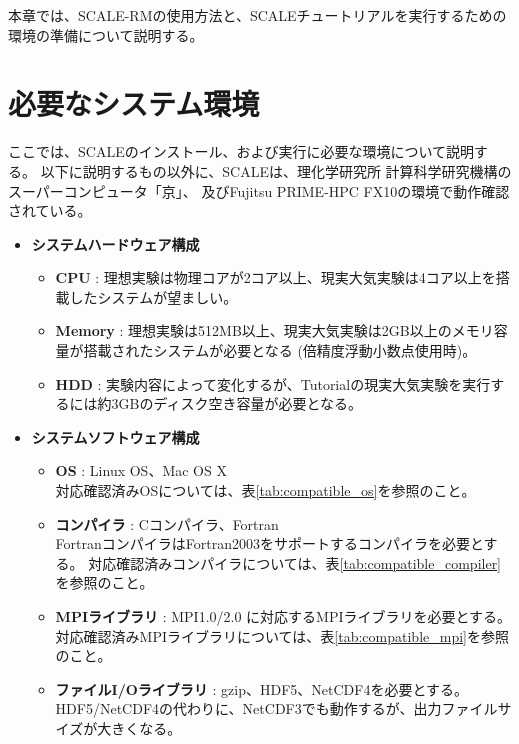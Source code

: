 
本章では、SCALE-RMの使用方法と、SCALEチュートリアルを実行するための環境の準備について説明する。

\section{必要なシステム環境}
\label{sec:req_env}
ここでは、SCALEのインストール、および実行に必要な環境について説明する。
以下に説明するもの以外に、SCALEは、理化学研究所 計算科学研究機構のスーパーコンピュータ「京」、
及びFujitsu PRIME-HPC FX10の環境で動作確認されている。

\begin{itemize}
  \item {\bf システムハードウェア構成}
  \begin{itemize}
    \item {\bf CPU} : 理想実験は物理コアが2コア以上、現実大気実験は4コア以上を搭載したシステムが望ましい。
    \item {\bf Memory} : 理想実験は512MB以上、現実大気実験は2GB以上のメモリ容量が搭載されたシステムが必要となる (倍精度浮動小数点使用時)。
    \item {\bf HDD} : 実験内容によって変化するが、Tutorialの現実大気実験を実行するには約3GBのディスク空き容量が必要となる。
  \end{itemize}

  \item {\bf システムソフトウェア構成}
  \begin{itemize}
  \item {\bf OS} : Linux OS、Mac OS X\\
        対応確認済みOSについては、表\ref{tab:compatible_os}を参照のこと。
  \item {\bf コンパイラ} : Cコンパイラ、Fortran\\
        FortranコンパイラはFortran2003をサポートするコンパイラを必要とする。
        対応確認済みコンパイラについては、表\ref{tab:compatible_compiler}を参照のこと。
  \item {\bf MPIライブラリ} : MPI1.0/2.0 に対応するMPIライブラリを必要とする。
        対応確認済みMPIライブラリについては、表\ref{tab:compatible_mpi}を参照のこと。
  \item {\bf ファイルI/Oライブラリ} : gzip、HDF5、NetCDF4を必要とする。\\
        HDF5/NetCDF4の代わりに、NetCDF3でも動作するが、出力ファイルサイズが大きくなる。
  \end{itemize}
\end{itemize}


